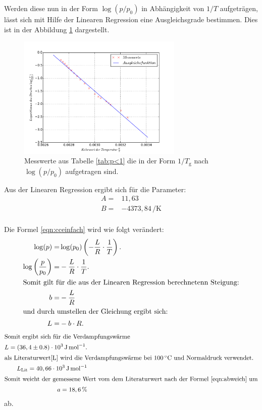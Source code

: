 \FloatBarrier
Werden diese nun in der Form $\log(p/p_\mathrm{0})$ in Abhängigkeit von
$1/T$ aufgeträgen,
lässt sich mit Hilfe der Linearen Regression eine
Ausgleichsgrade bestimmen.
Dies ist in der Abbildung \ref{abb:plot1} dargestellt.
\begin{figure}
  \centering
  \includegraphics[width=0.7\textwidth]{plot1.pdf}
  \caption{Messwerte aus Tabelle \ref{tab:p<1} die in der Form $1/T_\mathrm{g}$ nach $\log(p/p_\mathrm{0})$ aufgetragen sind.}
  \label{abb:plot1}
\end{figure}
\FloatBarrier
Aus der Linearen Regression ergibt sich für die Parameter:
\begin{align*}
  A=&   11,63\\
  B=&  -4373,84\,\si{\per\kelvin}
\end{align*}
\\
Die Formel \eqref{eqn:cceinfach} wird wie folgt verändert:
\begin{align}
\log(p)=& \log(p_\mathrm{0})\left(-\frac{L}{R}\cdot\frac{1}{T}\right).\\
\log\left(\frac{p}{p_\mathrm{0}}\right)=&-\frac{L}{R}\cdot\frac{1}{T}.\\
\intertext{Somit gilt für die aus der Linearen Regression berechnetenn Steigung:}
b=&-\frac{L}{R}\\
\intertext{und durch umstellen der Gleichung ergibt sich:}
L=&-b\cdot R.\\
\end{align}
\begin{align*}
\intertext{Somit ergibt sich für die Verdampfungswärme }
L=(36,4\pm0.8)\cdot 10^3 \,\si{\joule\per\mol}.\\
\intertext{als Literaturwert\cite{L} wird die Verdampfungswärme bei $100\,\si{\degreeCelsius}$ und Normaldruck verwendet.}
L_\mathrm{Lit}= 40,66\cdot 10^3 \,\si{\joule\per\mol}\\
\intertext{Somit weicht der gemessene Wert vom dem Literaturwert nach der Formel \eqref{eqn:abweich} um}
a=18,6 \,\si{\percent}
\end{align*}
ab.

